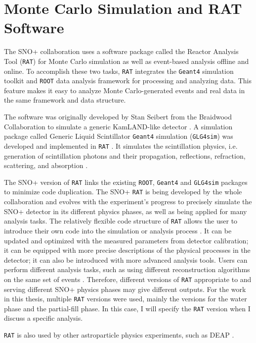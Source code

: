 \section{Monte Carlo Simulation and RAT Software}\label{sect:rat}

The SNO+ collaboration uses a software package called the Reactor Analysis Tool (\texttt{RAT}) for Monte Carlo simulation as well as event-based analysis offline and online. To accomplish these two tasks, \texttt{RAT} integrates the \texttt{Geant4} simulation toolkit \cite{agostinelli2003geant4} and \texttt{ROOT} data analysis framework \cite{brunroot} for processing and analyzing data. This feature makes it easy to analyze Monte Carlo-generated events and real data in the same framework and data structure.

The software was originally developed by Stan Seibert from the Braidwood Collaboration to simulate a generic KamLAND-like detector \cite{ratManual}. A simulation package called Generic Liquid Scintillator \texttt{Geant4} simulation (\texttt{GLG4sim}) was developed and implemented in \texttt{RAT} \cite{horton2006introduction}. It simulates the scintillation physics, i.e. generation of scintillation photons and their propagation, reflections, refraction, scattering, and absorption \cite{dunger2018topological}.

The SNO+ version of \texttt{RAT} links the existing \texttt{ROOT}, \texttt{Geant4} and \texttt{GLG4sim} packages to minimize code duplication. The SNO+ \texttt{RAT} is being developed by the whole collaboration and evolves with the experiment's progress to precisely simulate the SNO+ detector in its different physics phases, as well as being applied for many analysis tasks. The relatively flexible code structure of \texttt{RAT} allows the user to introduce their own code into the simulation or analysis process \cite{ratManual}. It can be updated and optimized with the measured parameters from detector calibration; it can be equipped with more precise descriptions of the physical processes in the detector; it can also be introduced with more advanced analysis tools. Users can perform different analysis tasks, such as using different reconstruction algorithms on the same set of events \cite{ratManual}. Therefore, different versions of \texttt{RAT} appropriate to and serving different SNO+ physics phases may give different outputs. For the work in this thesis, multiple \texttt{RAT} versions were used, mainly the versions for the water phase and the partial-fill phase. In this case, I will specify the \texttt{RAT} version when I discuss a specific analysis.

\texttt{RAT} is also used by other astroparticle physics experiments, such as DEAP \cite{caldwell2014simulation}.
